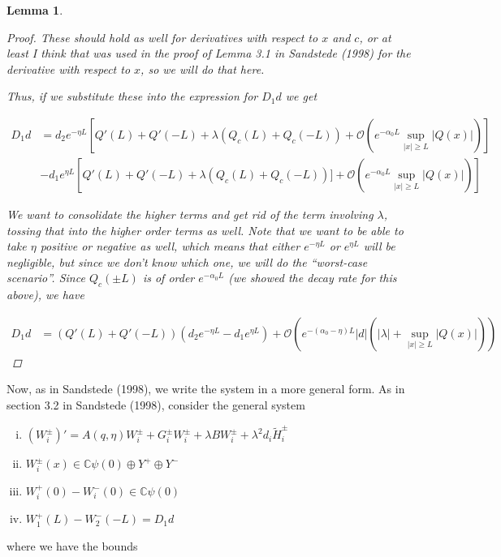 \documentclass[12pt]{article}
\def\C{{\mathbb C}}
\newtheorem{lemma}{Lemma}
\begin{document}
\begin{lemma}
\begin{proof}
These should hold as well for derivatives with respect to $x$ and $c$, or at least I think that was used in the proof of Lemma 3.1 in Sandstede (1998) for the derivative with respect to $x$, so we will do that here. 

Thus, if we substitute these into the expression for $D_1 d$ we get

\begin{align*}
D_1 d &= d_2 e^{-\eta L} \left[ Q'(L) + Q'(-L) + \lambda (Q_c(L) + Q_c(-L)) + \mathcal{O} \left( e^{-\alpha_0 L} \sup_{|x| \geq L} |Q(x)| \right) \right] \\
&- d_1 e^{\eta L} \left[ Q'(L) + Q'(-L) + \lambda (Q_c(L) + Q_c(-L))] + \mathcal{O} \left( e^{-\alpha_0 L} \sup_{|x| \geq L} |Q(x)| \right) \right]
\end{align*}

We want to consolidate the higher terms and get rid of the term involving $\lambda$, tossing that into the higher order terms as well. Note that we want to be able to take $\eta$ positive or negative as well, which means that either $e^{-\eta L}$ or $e^{\eta L}$ will be negligible, but since we don't know which one, we will do the ``worst-case scenario''. Since $Q_c(\pm L)$ is of order $e^{-\alpha_0 L}$ (we showed the decay rate for this above), we have 

\begin{align*}
D_1 d &= ( Q'(L) + Q'(-L) )(d_2 e^{-\eta L} - d_1 e^{\eta L}) + \mathcal{O} \left( e^{-(\alpha_0 - \eta) L}|d| \left( |\lambda| +  \sup_{|x| \geq L} |Q(x)| \right) \right)
\end{align*}

\end{proof}
\end{lemma}

Now, as in Sandstede (1998), we write the system in a more general form. As in section 3.2 in Sandstede (1998), consider the general system

\begin{enumerate}[(i)]
\item $(W_i^\pm)' = A(q, \eta) W_i^\pm + G_i^\pm W_i^\pm + \lambda B W_i^\pm + \lambda^2 d_i \tilde{H}_i^\pm$
\item $W_i^\pm(x) \in \C \psi(0) \oplus Y^+ \oplus Y^-$
\item $W_i^+(0) - W_i^-(0) \in \C \psi(0) $
\item $W_1^+(L) - W_2^-(-L) = D_1 d $
\end{enumerate}

where we have the bounds 
\end{document}
